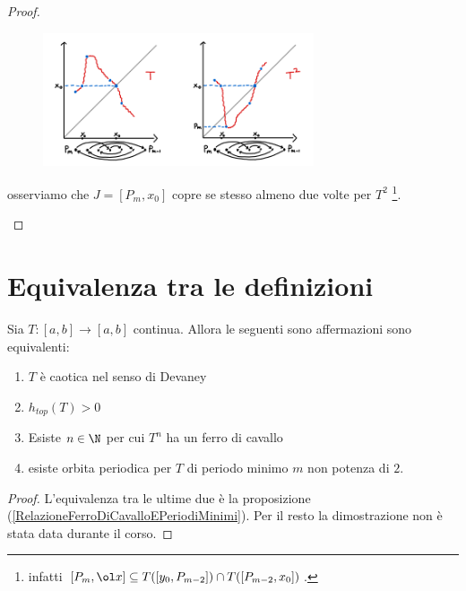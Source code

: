 \begin{proof}
\begin{enumerate}
\begin{figure}[!htb]
	\centering
	\includegraphics[width=8cm]{Immagini/Ferro_cavallo_2.png}
\end{figure}

osserviamo che $J=[P_m,x_0]$ copre se stesso almeno due volte per $T^2$ \footnote{infatti $[P_m,\ol x]\subseteq T([y_0,P_{m-2}])\cap T([P_{m-2},x_0])$.}.
\end{enumerate}
\setlength{\leftmargini}{0.5cm}
\end{proof}

\section*{Equivalenza tra le definizioni}
\begin{theorem}\label{CaratterizzazioneCaos}
Sia $T:[a,b]\to [a,b]$ continua. Allora le seguenti sono affermazioni sono equivalenti:
\begin{enumerate}
\item $T$ \`e caotica nel senso di Devaney
\item $h_{top}(T)>0$
\item Esiste $n\in\N$ per cui $T^n$ ha un ferro di cavallo
\item esiste orbita periodica per $T$ di periodo minimo $m$ non potenza di $2$.
\end{enumerate}
\end{theorem}
\begin{proof}
L'equivalenza tra le ultime due \`e la proposizione (\ref{RelazioneFerroDiCavalloEPeriodiMinimi}). Per il resto la dimostrazione non \`e stata data durante il corso.
\end{proof}

